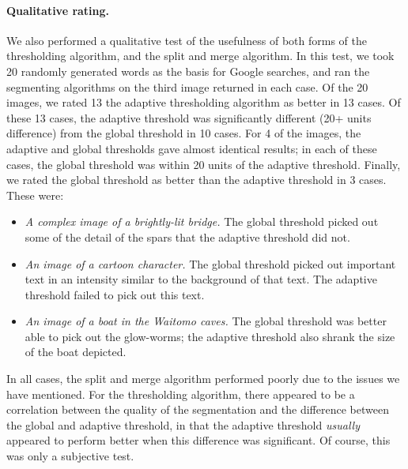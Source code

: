 \paragraph{Qualitative rating.}
We also performed a qualitative test of the usefulness of both forms of the thresholding algorithm, and the split and merge algorithm. In this test, we took 20 randomly generated words as the basis for Google searches, and ran the segmenting algorithms on the third image returned in each case. Of the 20 images, we rated 13 the adaptive thresholding algorithm as better in 13 cases. Of these 13 cases, the adaptive threshold was significantly different (20+ units difference) from the global threshold in 10 cases. For 4 of the images, the adaptive and global thresholds gave almost identical results; in each of these cases, the global threshold was within 20 units of the adaptive threshold. Finally, we rated the global threshold as better than the adaptive threshold in 3 cases. These were:
\begin{itemize}
   \item \emph{A complex image of a brightly-lit bridge.} The global threshold picked out some of the detail of the spars that the adaptive threshold did not.
   \item \emph{An image of a cartoon character.} The global threshold picked out important text in an intensity similar to the background of that text. The adaptive threshold failed to pick out this text.
   \item \emph{An image of a boat in the Waitomo caves.} The global threshold was better able to pick out the glow-worms; the adaptive threshold also shrank the size of the boat depicted.
\end{itemize}
In all cases, the split and merge algorithm performed poorly due to the issues we have mentioned. For the thresholding algorithm, there appeared to be a correlation between the quality of the segmentation and the difference between the global and adaptive threshold, in that the adaptive threshold \emph{usually} appeared to perform better when this difference was significant. Of course, this was only a subjective test.


